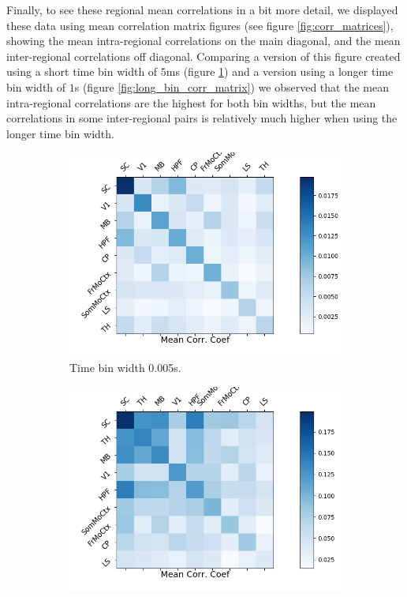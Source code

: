 \documentclass[a4paper,12pt]{article}
\theoremstyle{definition}
\begin{document}
  Finally, to see these regional mean correlations in a bit more detail, we displayed these data using mean correlation matrix figures (see figure \ref{fig:corr_matrices}), showing the mean intra-regional correlations on the main diagonal, and the mean inter-regional correlations off diagonal. Comparing a version of this figure created using a short time bin width of $5$ms (figure \ref{fig:short_bin_corr_matrix}) and a version using a longer time bin width of $1$s (figure \ref{fig:long_bin_corr_matrix}) we observed that the mean intra-regional correlations are the highest for both bin widths, but the mean correlations in some inter-regional pairs is relatively much higher when using the longer time bin width.

  \begin{figure}[h]
    \begin{subfigure}[h]{0.5\linewidth}
      \centering
      \includegraphics[width=\linewidth]{figures/Krebs_0p005_corr_matrix.png}
      \caption{Time bin width 0.005s.}
      \label{fig:short_bin_corr_matrix}
    \end{subfigure}
    \begin{subfigure}[h]{0.5\linewidth}
      \centering
      \includegraphics[width=\linewidth]{figures/Krebs_1p0_corr_matrix.png}

\end{subfigure}
\end{figure}
\end{document}
